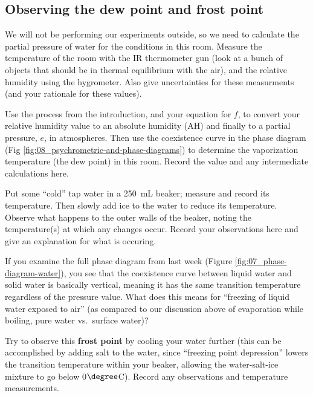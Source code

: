 \subsection{Observing the dew point and frost point}

We will not be performing our experiments outside, so we need to calculate the partial pressure of water for the conditions in this room.  Measure the temperature of the room with the IR thermometer gun (look at a bunch of objects that should be in thermal equilibrium with the air), and the relative humidity using the hygrometer.  Also give uncertainties for these measurments (and your rationale for these values).

\answerspace[3.5cm]

\noindent Use the process from the introduction, and your equation for $f$, to convert your relative humidity value to an absolute humidity (AH) and finally to a partial pressure, $e$, in atmospheres.  Then use the coexistence curve in the phase diagram (Fig \ref{fig:08_psychrometric-and-phase-diagrams}) to determine the vaporization temperature (the dew point) in this room.  Record the value and any intermediate calculations here.

\answerspace

\noindent Put some ``cold'' tap water in a 250~mL beaker; measure and record its temperature.  Then slowly add ice to the water to reduce its temperature.  Observe what happens to the outer walls of the beaker, noting the temperature(s) at which any changes occur.  Record your observations here and give an explanation for what is occuring.

\answerspace

\noindent If you examine the full phase diagram from last week  (Figure \ref{fig:07_phase-diagram-water}),  you see that the coexistence curve between liquid water and solid water is basically vertical, meaning it has the same transition temperature regardless of the pressure value.  What does this means for ``freezing of liquid water exposed to air'' (as compared to our discussion above of evaporation while boiling, pure water vs.\ surface water)?

\answerspace[3cm]  

\noindent Try to observe this {\bf frost point} by cooling your water further (this can be accomplished by adding salt to the water, since ``freezing point depression'' lowers the transition temperature within your beaker, allowing the water-salt-ice mixture to go below 0$\degree$C). Record any observations and temperature measurements.

